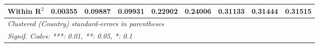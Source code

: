 \begin{table}[htbp]
\begin{tabular}{lcccccccc}
      Within R$^2$                                                                     & 0.00355  & 0.09887  & 0.09931  & 0.22902      & 0.24006       & 0.31133       & 0.31444       & 0.31515\\  
      \midrule \midrule
      \multicolumn{9}{l}{\emph{Clustered (Country) standard-errors in parentheses}}\\
      \multicolumn{9}{l}{\emph{Signif. Codes: ***: 0.01, **: 0.05, *: 0.1}}\\
   \end{tabular}
\end{table}


